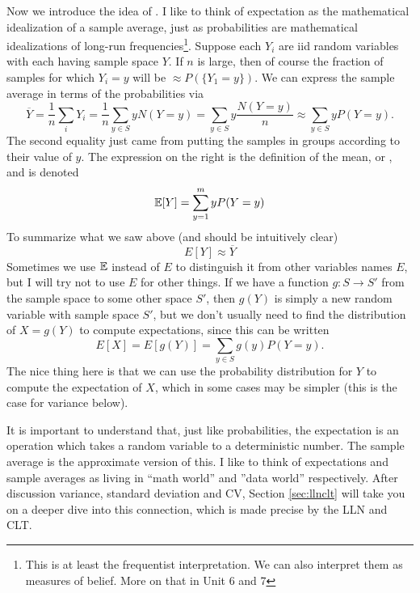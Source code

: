 Now we introduce the idea of . I like to think of expectation as the mathematical idealization of a sample average, just as probabilities are mathematical idealizations of long-run frequencies\footnote{This is at least the frequentist interpretation. We can also interpret them as measures of belief. More on that in Unit 6 and 7}.   Suppose each $Y_i$ are iid random variables with each having sample space $Y$. If $n$ is large, then of course the fraction of samples for which $Y_i= y$ will be $\approx P(\{Y_1=y\})$. We can express the sample average in terms of the probabilities via
 \begin{equation*}
\overline{Y} =  \frac{1}{n}\sum_{i}Y_i = \frac{1}{n} \sum_{y \in S} y N(Y=y) =\sum_{y \in S} y \frac{N(Y=y) }{n}\approx  \sum_{y\in S} y P(Y=y).
\end{equation*}
The second equality just came from putting the samples in groups according to their value of $y$. 
The expression on the right is the definition of the mean, or , and is denoted
\begin{equation}
\mathbb E[Y] = \sum_{y=1}^m y P(Y=y)
\end{equation}
  To summarize what we saw above (and should be intuitively clear) 
 \begin{equation}\label{eq:EappoverY}
 E[Y] \approx \overline{Y}
 \end{equation}
 Sometimes we use $\mathbb E$ instead of $E$ to distinguish it from other variables names $E$, but I will try not to use $E$ for other things. 
If we have a function $g:S \to S'$ from the sample space to some other space $S'$, then $g(Y)$ is simply a new random variable with sample space $S'$, but we don't usually need to find the distribution of $X = g(Y)$ to compute expectations, since this can be written  
\begin{equation}\label{eq:Efy}
E[X] = E[g(Y)] = \sum_{y\in S} g(y) P(Y=y). 
\end{equation}
The nice thing here is that we can use the probability distribution for $Y$ to compute the expectation of $X$, which in some cases may be simpler (this is the case for variance below). 

 It is important to understand that, just like probabilities, the expectation is an operation which takes a random variable to a deterministic number. The sample average is the approximate version of this. I like to think of expectations and sample averages as living in ``math world'' and ''data world'' respectively. After discussion variance, standard deviation and CV, Section \ref{sec:llnclt} will take you on a deeper dive into this connection, which is made precise by the LLN and CLT. 


